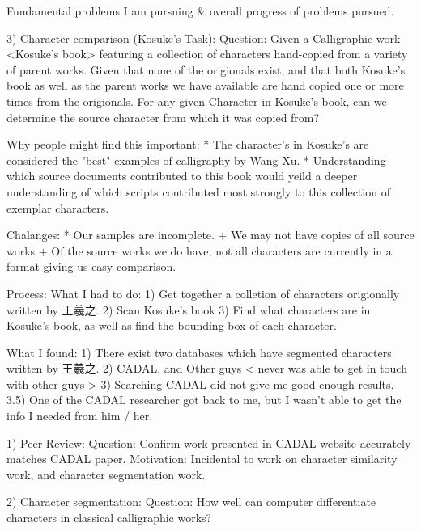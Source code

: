 Fundamental problems I am pursuing & overall progress of problems pursued.



3)  Character comparison (Kosuke's Task):
    Question:   Given a Calligraphic work <Kosuke's book> featuring a collection of characters hand-copied from a variety of parent works.
                Given that none of the origionals exist, and that both Kosuke's book as well as the parent works we have available are hand copied one or more times from the origionals.
                For any given Character in Kosuke's book, can we determine the source character from which it was copied from?
                






Why people might find this important:
    *  The character's in Kosuke's are considered the "best" examples of calligraphy by Wang-Xu.
    *  Understanding which source documents contributed to this book would yeild a deeper understanding of which scripts contributed most strongly to this collection of exemplar characters.
    
Chalanges:
    *  Our samples are incomplete.
        + We may not have copies of all source works
        + Of the source works we do have, not all characters are currently in a format giving us easy comparison.


Process:  What I had to do:
    1)  Get together a colletion of characters origionally written by 王羲之.
    2)  Scan Kosuke's book
    3)  Find what characters are in Kosuke's book, as well as find the bounding box of each character.
    
What I found:
    1)  There exist two databases which have segmented characters written by 王羲之.
    2)  CADAL, and Other guys < never was able to get in touch with other guys >
    3)  Searching CADAL did not give me good enough results.
    3.5)  One of the CADAL researcher got back to me, but I wasn't able to get the info I needed from him / her.


1)  Peer-Review:
    Question:  Confirm work presented in CADAL website accurately matches CADAL paper.
    Motivation:  Incidental to work on character similarity work, and character segmentation work.



2)  Character segmentation:
    Question:  How well can computer differentiate characters in classical calligraphic works?


